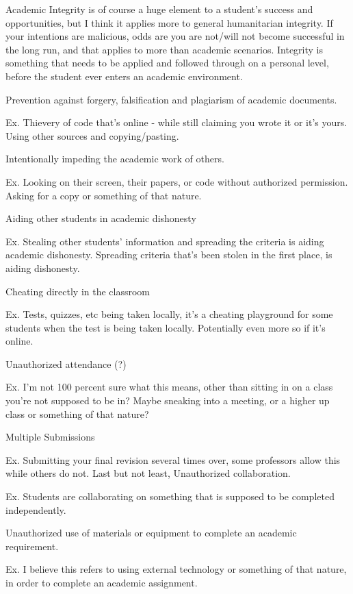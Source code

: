\documentclass[12pt]{article} %
\begin{document}
\tab Academic Integrity is of course a huge element to a student’s success and opportunities, but I think it applies more to general humanitarian integrity. If your intentions are malicious, odds are you are not/will not become successful in the long run, and that applies to more than academic scenarios. Integrity is something that needs to be applied and followed through on a personal level, before the student ever enters an academic environment. 

Prevention against forgery, falsification and plagiarism of academic documents.

Ex. Thievery of code that’s online - while still claiming you wrote it or it’s yours. Using other sources and copying/pasting. 

Intentionally impeding the academic work of others.

Ex. Looking on their screen, their papers, or code without authorized permission. Asking for a copy or something of that nature.

Aiding other students in academic dishonesty

Ex. Stealing other students' information and spreading the criteria is aiding academic dishonesty. Spreading criteria that’s been stolen in the first place, is aiding dishonesty. 

Cheating directly in the classroom

Ex. Tests, quizzes, etc being taken locally, it’s a cheating playground for some students when the test is being taken locally. Potentially even more so if it’s online.

Unauthorized attendance (?)

Ex. I’m not 100 percent sure what this means, other than sitting in on a class you’re not supposed to be in? Maybe sneaking into a meeting, or a higher up class or something of that nature?

Multiple Submissions

Ex. Submitting your final revision several times over, some professors allow this while others do not. 
Last but not least, Unauthorized collaboration. 

Ex. Students are collaborating on something that is supposed to be completed independently. 

Unauthorized use of materials or equipment to complete an academic requirement.

Ex. I believe this refers to using external technology or something of that nature, in order to complete an academic assignment.
\end{document}
